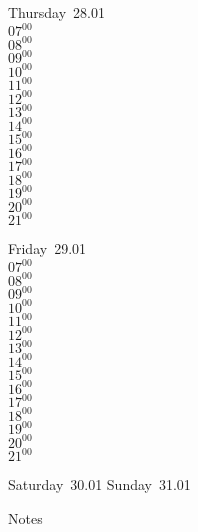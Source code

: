 \documentclass[11pt,a4paper]{book}\usepackage[]{graphicx}\usepackage[]{color}
\begin{document}
\clearpage
\begin{headerbox}
\end{headerbox}
\begin{weekdaybox}
  Thursday~28.01\\
  { 
  \vfill
  $07^{00}$\\
$08^{00}$\\
$09^{00}$\\
$10^{00}$\\
$11^{00}$\\
$12^{00}$\\
$13^{00}$\\
$14^{00}$\\
$15^{00}$\\
$16^{00}$\\
$17^{00}$\\
$18^{00}$\\
$19^{00}$\\
$20^{00}$\\
$21^{00}$\\
  }
\end{weekdaybox} 
\begin{weekdaybox}
  Friday~29.01\\
  { 
  \vfill
  $07^{00}$\\
$08^{00}$\\
$09^{00}$\\
$10^{00}$\\
$11^{00}$\\
$12^{00}$\\
$13^{00}$\\
$14^{00}$\\
$15^{00}$\\
$16^{00}$\\
$17^{00}$\\
$18^{00}$\\
$19^{00}$\\
$20^{00}$\\
$21^{00}$\\
  }
\end{weekdaybox}
\begin{weekendbox}
  Saturday~30.01
  \tcblower
  Sunday~31.01
\end{weekendbox} %
\begin{notebox}
  Notes
\end{notebox}
\clearpage
\end{document}
